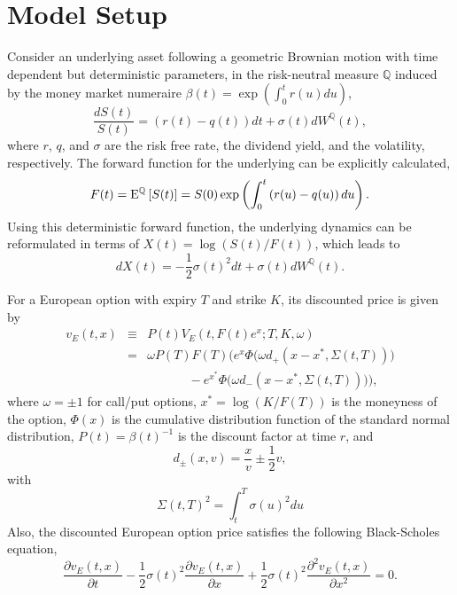 \documentclass[12pt]{article}
\begin{document}
  \section{Model Setup}

    Consider an underlying asset following a geometric Brownian motion with time dependent but deterministic
    parameters, in the risk-neutral measure $\mathbb{Q}$ induced by the money market numeraire $\beta(t)=
    \exp\left(\int_0^tr(u)du\right)$,
    \begin{equation}
      \frac{dS(t)}{S(t)}=\left(r(t)-q(t)\right)dt+\sigma(t)dW^{\mathbb{Q}}(t),
    \end{equation}
    where $r$, $q$, and $\sigma$ are the risk free rate, the dividend yield, and the volatility, respectively.
    The forward function for the underlying can be explicitly calculated,
    \begin{equation}
      F(t)={\rm E}^{\mathbb{Q}}\left[S(t)\right]=S(0)\exp\left(\int_0^t\left(r(u)-q(u)\right)du\right).
    \end{equation}
    Using this deterministic forward function, the underlying dynamics can be reformulated in terms of
    $X(t)=\log\left(S(t)/F(t)\right)$, which leads to
    \begin{equation}
      dX(t) = -\frac{1}{2}\sigma(t)^2dt + \sigma(t)dW^{\mathbb{Q}}(t).
    \end{equation}

    For a European option with expiry $T$ and strike $K$, its discounted price is given by
    \begin{eqnarray}
      \label{Euro1}
      v_E(t,x)&\equiv&P(t)V_E(t,F(t)e^x;T,K,\omega)\nonumber\\
                         &=&\omega P(T)F(T)\bigg(e^x\Phi\big(\omega d_+\left(x-x^*,\Sigma(t,T)\right)\big)\nonumber\\
                         &&\ \ \ \ \ \ \ \ \ \ \ \ \ \ \ -e^{x^*}\Phi\big(\omega d_-\left(x-x^*,\Sigma(t,T)\right)\big)\bigg),
    \end{eqnarray}
    where $\omega=\pm 1$ for call/put options, $x^*=\log(K/F(T))$ is the moneyness of the option, $\Phi(x)$
    is the cumulative distribution function of the standard normal distribution, $P(t)=\beta(t)^{-1}$ is the discount
    factor at time $r$, and
    \begin{equation}
      d_{\pm}(x, v)=\frac{x}{v}\pm\frac{1}{2}v,
    \end{equation}
    with
    \begin{equation}
      \Sigma(t,T)^2=\int_t^T\sigma(u)^2du
    \end{equation}
    Also, the discounted European option price satisfies the following Black-Scholes equation,
    \begin{equation}
      \frac{\partial v_E(t,x)}{\partial t}-\frac{1}{2}\sigma(t)^2\frac{\partial v_E(t,x)}{\partial x}
         +\frac{1}{2}\sigma(t)^2\frac{\partial^2 v_E(t,x)}{\partial x^2}=0.
    \end{equation}
\end{document}

